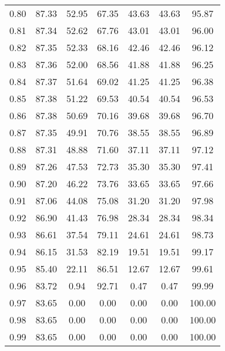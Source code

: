 \begin{tabular}{|c|c|c|c|c|c|c|}
      0.80 &     87.33 &     52.95 &      67.35 &   43.63 &      43.63 &         95.87 \\
      0.81 &     87.34 &     52.62 &      67.76 &   43.01 &      43.01 &         96.00 \\
      0.82 &     87.35 &     52.33 &      68.16 &   42.46 &      42.46 &         96.12 \\
      0.83 &     87.36 &     52.00 &      68.56 &   41.88 &      41.88 &         96.25 \\
      0.84 &     87.37 &     51.64 &      69.02 &   41.25 &      41.25 &         96.38 \\
      0.85 &     87.38 &     51.22 &      69.53 &   40.54 &      40.54 &         96.53 \\
      0.86 &     87.38 &     50.69 &      70.16 &   39.68 &      39.68 &         96.70 \\
      0.87 &     87.35 &     49.91 &      70.76 &   38.55 &      38.55 &         96.89 \\
      0.88 &     87.31 &     48.88 &      71.60 &   37.11 &      37.11 &         97.12 \\
      0.89 &     87.26 &     47.53 &      72.73 &   35.30 &      35.30 &         97.41 \\
      0.90 &     87.20 &     46.22 &      73.76 &   33.65 &      33.65 &         97.66 \\
      0.91 &     87.06 &     44.08 &      75.08 &   31.20 &      31.20 &         97.98 \\
      0.92 &     86.90 &     41.43 &      76.98 &   28.34 &      28.34 &         98.34 \\
      0.93 &     86.61 &     37.54 &      79.11 &   24.61 &      24.61 &         98.73 \\
      0.94 &     86.15 &     31.53 &      82.19 &   19.51 &      19.51 &         99.17 \\
      0.95 &     85.40 &     22.11 &      86.51 &   12.67 &      12.67 &         99.61 \\
      0.96 &     83.72 &      0.94 &      92.71 &    0.47 &       0.47 &         99.99 \\
      0.97 &     83.65 &      0.00 &       0.00 &    0.00 &       0.00 &        100.00 \\
      0.98 &     83.65 &      0.00 &       0.00 &    0.00 &       0.00 &        100.00 \\
      0.99 &     83.65 &      0.00 &       0.00 &    0.00 &       0.00 &        100.00 \\
\bottomrule
\end{tabular}
